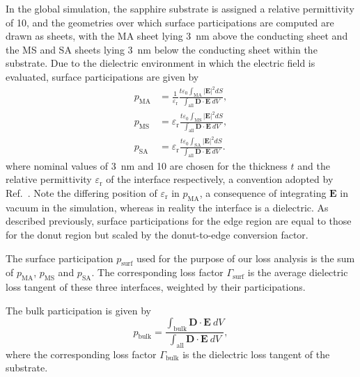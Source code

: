 \documentclass[
    reprint,
    superscriptaddress,
    amsmath,amssymb,
    aps,
    prb,
    floatfix,
]{revtex4-2}
\begin{document}
In the global simulation, the sapphire substrate is assigned a relative permittivity of 10, and the geometries over which surface participations are computed are drawn as sheets, with the MA sheet lying \SI{3}{\nano\meter} above the conducting sheet and the MS and SA sheets lying \SI{3}{\nano\meter} below the conducting sheet within the substrate. Due to the dielectric environment in which the electric field is evaluated, surface participations are given by
\begin{align}
    p_\mathrm{MA}
    &=\frac{1}{\varepsilon_\mathrm{r}}\frac{t\varepsilon_0\int_\mathrm{MA}\left|\mathbf{E}\right|^2dS}
    {\int_\mathrm{all}\mathbf{D}\cdot\mathbf{E}~dV}, \\
    p_\mathrm{MS}
    &=\varepsilon_\mathrm{r}\frac{t\varepsilon_0\int_\mathrm{MS}\left|\mathbf{E}\right|^2dS}
    {\int_\mathrm{all}\mathbf{D}\cdot\mathbf{E}~dV}, \\
    p_\mathrm{SA}
    &=\varepsilon_\mathrm{r}\frac{t\varepsilon_0\int_\mathrm{SA}\left|\mathbf{E}\right|^2dS}
    {\int_\mathrm{all}\mathbf{D}\cdot\mathbf{E}~dV}.
    \label{eq:surface}
\end{align}
where nominal values of \SI{3}{\nano\meter} and 10 are chosen for the thickness $t$ and the relative permittivity $\varepsilon_\mathrm{r}$ of the interface respectively, a convention adopted by Ref.~\cite{wenner2011,woods2019,melville2020,ganjam2024,gupta2025}.
Note the differing position of $\varepsilon_\mathrm{r}$ in $p_\mathrm{MA}$, a consequence of integrating $\mathbf{E}$ in vacuum in the simulation, whereas in reality the interface is a dielectric. As described previously, surface participations for the edge region are equal to those for the donut region but scaled by the donut-to-edge conversion factor.

The surface participation $p_\mathrm{surf}$ used for the purpose of our loss analysis is the sum of $p_\mathrm{MA}$, $p_\mathrm{MS}$ and $p_\mathrm{SA}$. The corresponding loss factor $\Gamma_\mathrm{surf}$ is the average dielectric loss tangent of these three interfaces, weighted by their participations.

The bulk participation is given by
\begin{equation}
    p_\mathrm{bulk}=\frac{\int_\mathrm{bulk}\mathbf{D}\cdot\mathbf{E}~dV}{\int_\mathrm{all}\mathbf{D}\cdot\mathbf{E}~dV},
    \label{eq:bulk}
\end{equation}
where the corresponding loss factor $\Gamma_\mathrm{bulk}$ is the dielectric loss tangent of the substrate.
\end{document}
